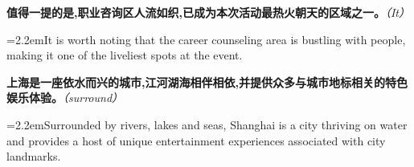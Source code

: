 \documentclass[11pt,a4paper]{article}
\newcommand{\num}[1]{\makebox[1.9em][r]{#1.}\hspace{0.3em}}
\newcommand{\prompt}[1]{\emph{\textcolor{tipblue}{\small（#1）}}}
\begin{document}
\begin{minipage}{\linewidth}

\num{35}\textbf{值得一提的是,职业咨询区人流如织,已成为本次活动最热火朝天的区域之一。}\prompt{It}

\vspace{0.15em}

\noindent\hangindent=2.2em\hspace{2.2em}It is worth noting that the career counseling area is bustling with people, making it one of the liveliest spots at the event.

\end{minipage}

\begin{minipage}{\linewidth}

\num{36}\textbf{上海是一座依水而兴的城市,江河湖海相伴相依,并提供众多与城市地标相关的特色娱乐体验。}\prompt{surround}

\vspace{0.15em}

\noindent\hangindent=2.2em\hspace{2.2em}Surrounded by rivers, lakes and seas, Shanghai is a city thriving on water and provides a host of unique entertainment experiences associated with city landmarks.

\end{minipage}
\end{document}
